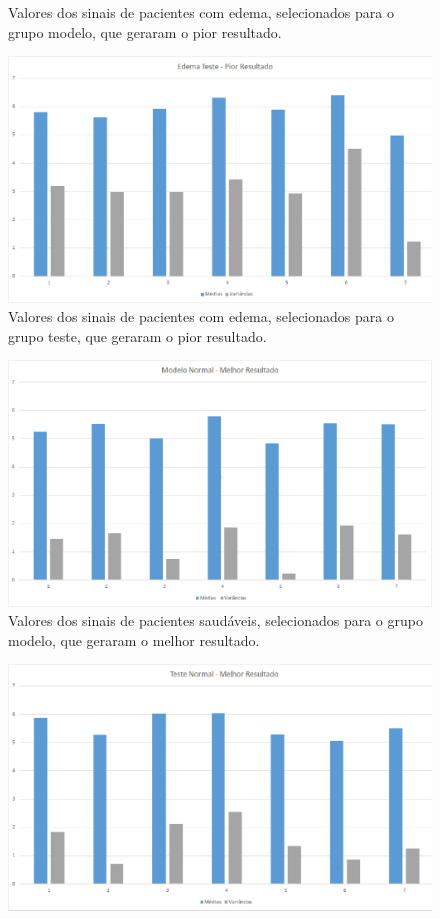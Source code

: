 \documentclass[a4paper,12pt,oneside]{report}
\begin{document}
\begin{appendices}
\begin{figure}
\caption{Valores dos sinais de pacientes com edema, selecionados para o grupo modelo, que geraram o pior resultado. }
\label{fig:edema_modelo_pior}
\end{figure}
\begin{figure}
\centering
\includegraphics[width=0.70\hsize]{figuras_tcc/pior_resultado/edema_teste_pior.eps}
\caption{Valores dos sinais de pacientes com edema, selecionados para o grupo teste, que geraram o pior resultado. }
\label{fig:edema_teste_pior}
\end{figure}
\begin{figure}
\centering
\includegraphics[width=0.70\hsize]{figuras_tcc/melhor_resultado/modelo_normal_melhor.eps}
\caption{Valores dos sinais de pacientes saud\'{a}veis, selecionados para o grupo modelo, que geraram o melhor resultado. }
\label{fig:normal_modelo_melhor}
\end{figure}
\begin{figure}
\centering
\includegraphics[width=0.70\hsize]{figuras_tcc/melhor_resultado/teste_normal_melhor.eps}

\end{figure}
\end{appendices}
\end{document}
